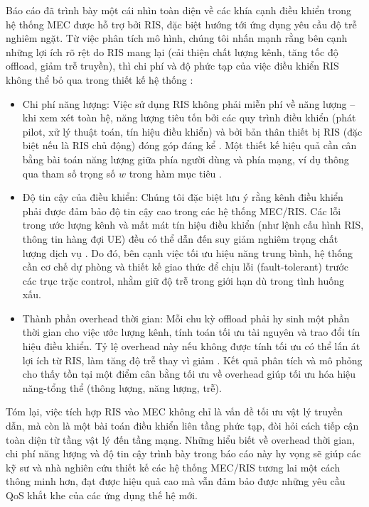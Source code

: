 Báo cáo đã trình bày một cái nhìn toàn diện về các khía cạnh điều khiển trong hệ thống MEC được hỗ trợ bởi RIS, đặc biệt hướng tới ứng dụng yêu cầu độ trễ nghiêm ngặt. Từ việc phân tích mô hình, chúng tôi nhấn mạnh rằng bên cạnh những lợi ích rõ rệt do RIS mang lại (cải thiện chất lượng kênh, tăng tốc độ offload, giảm trễ truyền), thì chi phí và độ phức tạp của việc điều khiển RIS không thể bỏ qua trong thiết kế hệ thống :

\begin{itemize}
    \item Chi phí năng lượng: Việc sử dụng RIS không phải miễn phí về năng lượng – khi xem xét toàn hệ, năng lượng tiêu tốn bởi các quy trình điều khiển (phát pilot, xử lý thuật toán, tín hiệu điều khiển) và bởi bản thân thiết bị RIS (đặc biệt nếu là RIS chủ động) đóng góp đáng kể  . Một thiết kế hiệu quả cần cân bằng bài toán năng lượng giữa phía người dùng và phía mạng, ví dụ thông qua tham số trọng số $w$ trong hàm mục tiêu .
    \item Độ tin cậy của điều khiển: Chúng tôi đặc biệt lưu ý rằng kênh điều khiển phải được đảm bảo độ tin cậy cao trong các hệ thống MEC/RIS. Các lỗi trong ước lượng kênh và mất mát tín hiệu điều khiển (như lệnh cấu hình RIS, thông tin hàng đợi UE) đều có thể dẫn đến suy giảm nghiêm trọng chất lượng dịch vụ  . Do đó, bên cạnh việc tối ưu hiệu năng trung bình, hệ thống cần cơ chế dự phòng và thiết kế giao thức để chịu lỗi (fault-tolerant) trước các trục trặc control, nhằm giữ độ trễ trong giới hạn dù trong tình huống xấu.
    \item Thành phần overhead thời gian: Mỗi chu kỳ offload phải hy sinh một phần thời gian cho việc ước lượng kênh, tính toán tối ưu tài nguyên và trao đổi tín hiệu điều khiển. Tỷ lệ overhead này nếu không được tính tối ưu có thể lấn át lợi ích từ RIS, làm tăng độ trễ thay vì giảm  . Kết quả phân tích và mô phỏng cho thấy tồn tại một điểm cân bằng tối ưu về overhead giúp tối ưu hóa hiệu năng-tổng thể (thông lượng, năng lượng, trễ).
\end{itemize}



Tóm lại, việc tích hợp RIS vào MEC không chỉ là vấn đề tối ưu vật lý truyền dẫn, mà còn là một bài toán điều khiển liên tầng phức tạp, đòi hỏi cách tiếp cận toàn diện từ tầng vật lý đến tầng mạng. Những hiểu biết về overhead thời gian, chi phí năng lượng và độ tin cậy trình bày trong báo cáo này hy vọng sẽ giúp các kỹ sư và nhà nghiên cứu thiết kế các hệ thống MEC/RIS tương lai một cách thông minh hơn, đạt được hiệu quả cao mà vẫn đảm bảo được những yêu cầu QoS khắt khe của các ứng dụng thế hệ mới.